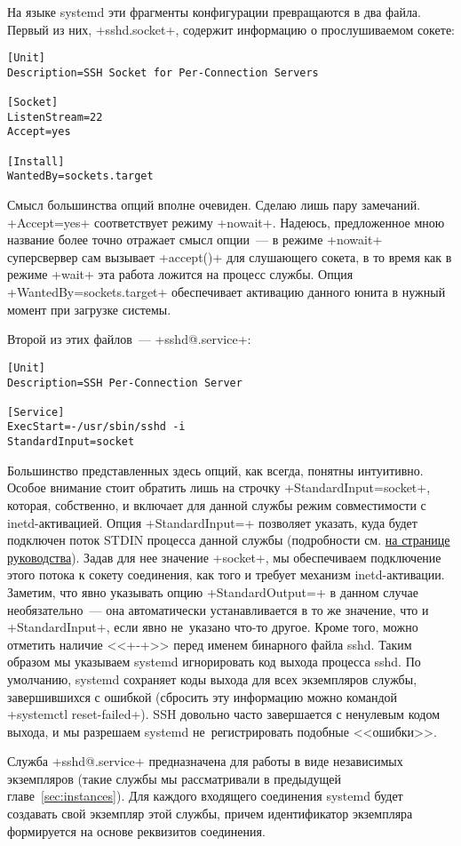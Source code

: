 \documentclass[10pt,oneside,a4paper]{article}
\begin{document}
На языке systemd эти фрагменты конфигурации превращаются в два файла. Первый из
них, +sshd.socket+, содержит информацию о прослушиваемом сокете:
\begin{Verbatim}
[Unit]
Description=SSH Socket for Per-Connection Servers

[Socket]
ListenStream=22
Accept=yes

[Install]
WantedBy=sockets.target
\end{Verbatim}

Смысл большинства опций вполне очевиден. Сделаю лишь пару замечаний.
+Accept=yes+ соответствует режиму +nowait+. Надеюсь, предложенное мною название
более точно отражает смысл опции~--- в режиме +nowait+ суперсвервер сам вызывает
+accept()+ для слушающего сокета, в то время как в режиме +wait+ эта работа
ложится на процесс службы. Опция +WantedBy=sockets.target+ обеспечивает
активацию данного юнита в нужный момент при загрузке системы.

Второй из этих файлов~--- +sshd@.service+:
\begin{Verbatim}
[Unit]
Description=SSH Per-Connection Server

[Service]
ExecStart=-/usr/sbin/sshd -i
StandardInput=socket
\end{Verbatim}

Большинство представленных здесь опций, как всегда, понятны интуитивно. Особое
внимание стоит обратить лишь на строчку +StandardInput=socket+, которая,
собственно, и включает для данной службы режим совместимости с inetd-активацией.
Опция +StandardInput=+ позволяет указать, куда будет подключен поток STDIN
процесса данной службы (подробности см.
\href{http://0pointer.de/public/systemd-man/systemd.exec.html}{на странице
руководства}). Задав для нее значение +socket+, мы обеспечиваем подключение
этого потока к сокету соединения, как того и требует механизм inetd-активации.
Заметим, что явно указывать опцию +StandardOutput=+ в данном случае
необязательно~--- она автоматически устанавливается в то же значение, что и
+StandardInput+, если явно не~указано что-то другое. Кроме того, можно отметить
наличие <<+-+>> перед именем бинарного файла sshd. Таким образом мы указываем
systemd игнорировать код выхода процесса sshd. По умолчанию, systemd сохраняет
коды выхода для всех экземпляров службы, завершившихся с ошибкой (сбросить эту
информацию можно командой +systemctl reset-failed+). SSH
довольно часто завершается с ненулевым кодом выхода, и мы разрешаем systemd
не~регистрировать подобные <<ошибки>>.

Служба +sshd@.service+ предназначена для работы в виде независимых экземпляров
(такие службы мы рассматривали в предыдущей главе~\ref{sec:instances}). Для
каждого входящего соединения systemd будет создавать свой экземпляр этой службы,
причем идентификатор экземпляра формируется на основе реквизитов соединения.
\end{document}
